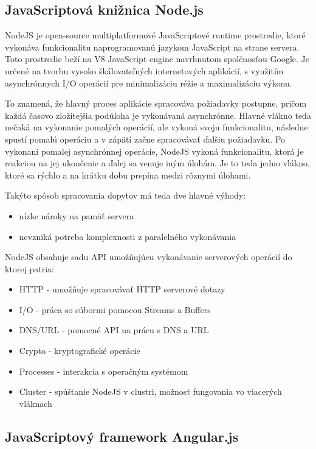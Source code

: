\subsection{JavaScriptová knižnica Node.js}
NodeJS je open-source multiplatformové JavaScriptové runtime prostredie, ktoré vykonáva funkcionalitu naprogramovanú jazykom JavaScript na strane servera. Toto prostredie beží na V8 JavaScript engine navrhnutom spolčnosťou Google. Je určené na tvorbu vysoko škálovateľných internetových aplikácií, s využitím asynchrónnych I/O operácií \cite{doi:10.1109/MIC.2010.145} pre minimalizáciu réžie a maximalizáciu výkonu. 

To znamená, že hlavný proces aplikácie spracováva požiadavky postupne, pričom každá časovo zložitejšia podúloha je vykonávaná asynchrónne. Hlavné vlákno teda nečaká na vykonanie pomalých operácií, ale vykoná svoju funkcionalitu, následne spustí pomalú operáciu a v zápätí začne spracovávať ďalšiu požiadavku. Po vykonaní pomalej asynchrónnej operácie, NodeJS vykoná funkcionalitu, ktorá je reakciou na jej ukončenie a ďalej sa venuje iným úlohám. Je to teda jedno vlákno, ktoré sa rýchlo a na krátku dobu prepína medzi rôznymi úlohami. 

Takýto spôsob spracovania dopytov má teda dve hlavné výhody:
\begin{itemize}
	\item nízke nároky na pamäť servera
	\item nevzniká potreba komplexnosti z paralelného vykonávania
\end{itemize}

NodeJS obsahuje sadu API umožňujúcu vykonávanie serverových operácií do ktorej patria:
\begin{itemize}
	\item HTTP - umožňuje spracovávať HTTP serverové dotazy
	\item I/O - práca so súbormi pomocou Streams a Buffers
	\item DNS/URL - pomocné API na prácu s DNS a URL
	\item Crypto - kryptografické operácie
	\item Processes - interakcia s operačným systémom
	\item Cluster - spúšťanie NodeJS v clustri, možnosť fungovania vo viacerých vláknach
\end{itemize}


\subsection{JavaScriptový framework Angular.js}

